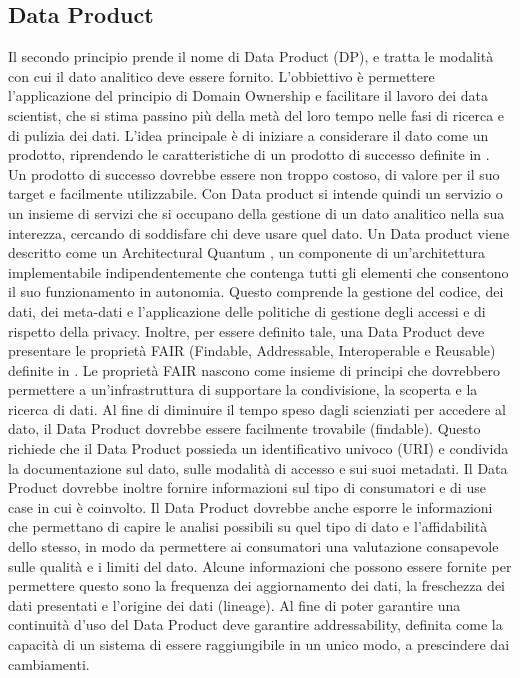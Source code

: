 \documentclass[a4paper,12pt]{report}
\begin{document}
\subsection{Data Product}
Il secondo principio prende il nome di Data Product (DP), e tratta le modalità con cui il dato analitico deve essere fornito.
L'obbiettivo è permettere l'applicazione del principio di Domain Ownership e facilitare il lavoro dei data scientist, che si stima passino più della metà del loro tempo nelle fasi di ricerca e di pulizia dei dati.
L'idea principale è di iniziare a considerare il dato come un prodotto, riprendendo le caratteristiche di un prodotto di successo definite in \cite{cagan_inspired_2017}. 
Un prodotto di successo dovrebbe essere non troppo costoso, di valore per il suo target e facilmente utilizzabile.
Con Data product si intende quindi un servizio o un insieme di servizi che si occupano della gestione di un dato analitico nella sua interezza, cercando di soddisfare chi deve usare quel dato.
Un Data product viene descritto come un Architectural Quantum \cite{ford_building_2022}, un componente di un'architettura implementabile indipendentemente che contenga tutti gli elementi che consentono il suo funzionamento in autonomia.
Questo comprende la gestione del codice, dei dati, dei meta-dati e l'applicazione delle politiche di gestione degli accessi e di rispetto della privacy.
Inoltre, per essere definito tale, una Data Product deve presentare le proprietà FAIR (Findable, Addressable, Interoperable e Reusable) definite in \cite{wilkinson_fair_2016}. 
Le proprietà FAIR nascono come insieme di principi che dovrebbero permettere a un'infrastruttura di supportare la condivisione, la scoperta e la ricerca di dati. 
Al fine di diminuire il tempo speso dagli scienziati per accedere al dato, il Data Product dovrebbe essere facilmente trovabile (findable).
Questo richiede che il Data Product possieda un identificativo univoco (URI) e condivida la documentazione sul dato, sulle modalità di accesso e sui suoi metadati.
Il Data Product dovrebbe inoltre fornire informazioni sul tipo di consumatori e di use case in cui è coinvolto. 
Il Data Product dovrebbe anche esporre le informazioni che permettano di capire le analisi possibili su quel tipo di dato e l'affidabilità dello stesso, in modo da permettere ai consumatori una valutazione consapevole sulle qualità e i limiti del dato.
Alcune informazioni che possono essere fornite per permettere questo sono la frequenza dei aggiornamento dei dati, la freschezza dei dati presentati e l'origine dei dati (lineage).
Al fine di poter garantire una continuità d'uso del Data Product deve garantire addressability, definita come la capacità di un sistema di essere raggiungibile in un unico modo, a prescindere dai cambiamenti.
\end{document}
